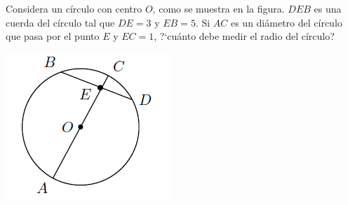 \begin{Solucion}
  
\end{Solucion}

\begin{Problema}{13}
  Considera un c\'irculo con centro $O$, como se muestra en la figura.
  $DEB$ es una cuerda del c\'irculo tal que $DE=3$ y $EB=5$. Si $AC$
  es un di\'ametro del c\'irculo que pasa por el punto $E$ y $EC=1$,
  ?`cu\'anto debe medir el radio del c\'irculo?

  \begin{center}
    \includegraphics[scale=0.85]{problema2.png}
  \end{center}
\end{Problema}

\begin{Solucion}
  
\end{Solucion}


